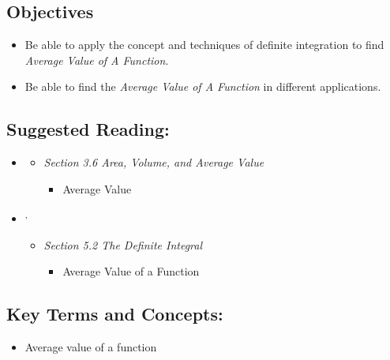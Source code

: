 
\vspace{-0.25 in}
\begin{framed}
\subsection*{Objectives}
\begin{itemize}
    \item Be able to apply the concept and techniques of definite integration to find \emph{Average Value of A Function}.
    \item Be able to find the \emph{Average Value of A Function} in different applications.
\end{itemize}

\subsection*{Suggested Reading:}
\begin{itemize}
\item \cite{Calaway}\footnotemark[1]
   \begin{itemize}
        \item \emph{Section 3.6 Area, Volume, and Average Value}
        \begin{itemize}
            \item Average Value
        \end{itemize}
    \end{itemize}
    
\item \cite{openstax}\footnotemark[2]\textsuperscript{,}\footnotemark[3]
    \begin{itemize}
        \item \emph{Section 5.2 The Definite Integral}
        \begin{itemize}
            \item Average Value of a Function
        \end{itemize}
    \end{itemize}
\end{itemize}
\subsection*{Key Terms and Concepts:} 

\begin{multicols}{2}
\begin{itemize}
    \item Average value of a function
    
\end{itemize}
\end{multicols}
\end{framed}
